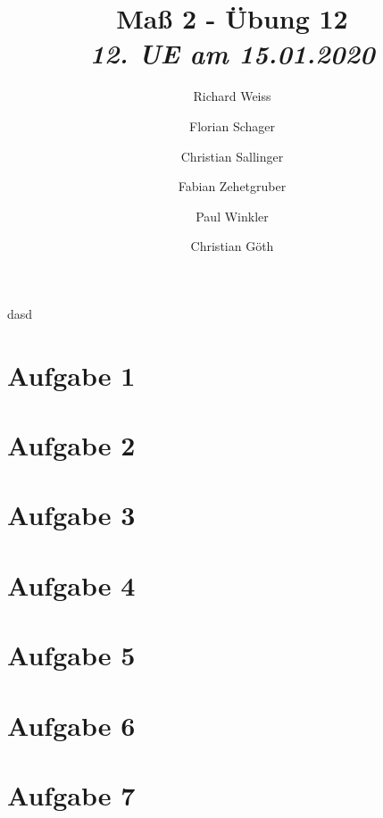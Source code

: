 \documentclass[]{article}
\title
{
  Maß 2 - Übung 12 \\
  \vspace{4pt}
  \normalsize
  \textit{12. UE am 15.01.2020}
}
\author
{
  Richard Weiss       \and
  Florian Schager     \and
  Christian Sallinger \and
  Fabian Zehetgruber  \and
  Paul Winkler        \and
  Christian Göth
}
\date{}
\begin{document}
    \begin{titlepage}
        \maketitle
    \end{titlepage}
    dasd
    \section*{Aufgabe 1}
    
    \section*{Aufgabe 2}
    
    \section*{Aufgabe 3}
    
    \section*{Aufgabe 4}
    
    \section*{Aufgabe 5}
    
    \section*{Aufgabe 6}
    
    \section*{Aufgabe 7}
    
\end{document}
